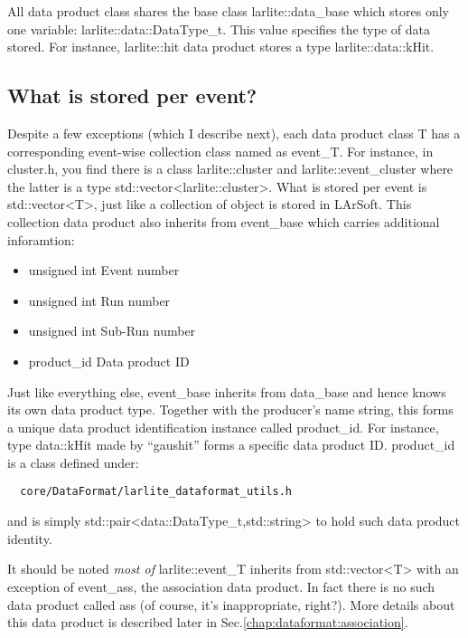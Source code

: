All data product class shares the base class {\ttfamily larlite::data\_base} which stores only one variable: {\ttfamily larlite::data::DataType\_t}. This \enum value specifies the type of data stored. For instance, {\ttfamily larlite::hit} data product stores a type {\ttfamily larlite::data::kHit}.

\subsection{What is stored per event?}
Despite a few exceptions (which I describe next), each data product class {\ttfamily T} has a corresponding event-wise collection class
named as {\ttfamily event\_T}. 
For instance, in {\ttfamily cluster.h}, you find there is a class {\ttfamily larlite::cluster} and {\ttfamily larlite::event\_cluster} where the latter is a type {\ttfamily std::vector<larlite::cluster>}. What is stored per event is {\ttfamily std::vector<T>}, just like a collection of object is stored in LArSoft. This collection data product also inherits from {\ttfamily event\_base} which carries additional inforamtion:
\begin{itemize}
\item {\ttfamily unsigned int} Event number
\item {\ttfamily unsigned int} Run number
\item {\ttfamily unsigned int} Sub-Run number
\item {\ttfamily product\_id} Data product ID 
\end{itemize}
Just like everything else, {\ttfamily event\_base} inherits from {\ttfamily data\_base} and hence knows its own data product type. Together with the producer's name string, this forms a unique data product identification instance called {\ttfamily product\_id}. For instance, type {\ttfamily data::kHit} made by ``gaushit'' forms a specific data product ID. {\ttfamily product\_id} is a class defined under:
\begin{lstlisting}
  core/DataFormat/larlite_dataformat_utils.h
\end{lstlisting}
and is simply {\ttfamily std::pair<data::DataType\_t,std::string>} to hold such data product identity.

It should be noted {\it most of} {\ttfamily larlite::event\_T} inherits from {\ttfamily std::vector<T>} with an exception of {\ttfamily event\_ass}, the association data product. In fact there is no such data product called {\ttfamily ass} (of course, it's inappropriate, right?). More details about this data product is described later in Sec.\ref{chap:dataformat:association}.

